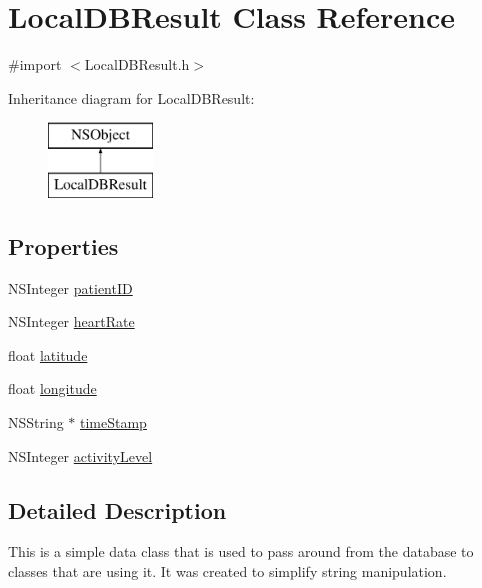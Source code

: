 \hypertarget{interface_local_d_b_result}{\section{Local\-D\-B\-Result Class Reference}
\label{interface_local_d_b_result}
}


{\ttfamily \#import $<$Local\-D\-B\-Result.\-h$>$}

Inheritance diagram for Local\-D\-B\-Result\-:\begin{figure}[H]
\begin{center}
\leavevmode
\includegraphics[height=2.000000cm]{interface_local_d_b_result}
\end{center}
\end{figure}
\subsection*{Properties}
\begin{DoxyCompactItemize}
\item 
N\-S\-Integer \hyperlink{interface_local_d_b_result_a5cdd651e87ce4b0e2ed296fd1a54f271}{patient\-I\-D}
\item 
N\-S\-Integer \hyperlink{interface_local_d_b_result_a59bb8d9536b92e3bbd6c244d13771ccc}{heart\-Rate}
\item 
float \hyperlink{interface_local_d_b_result_a55f83e49659fb4d15db30117f90dcea7}{latitude}
\item 
float \hyperlink{interface_local_d_b_result_ae50e0676b6cac4cad3e565c5caa117b2}{longitude}
\item 
N\-S\-String $\ast$ \hyperlink{interface_local_d_b_result_a7538fcbcfd150e5353d3d4e531bef2bc}{time\-Stamp}
\item 
N\-S\-Integer \hyperlink{interface_local_d_b_result_a10d275e102bd14b0a071b5572fbf62d3}{activity\-Level}
\end{DoxyCompactItemize}


\subsection{Detailed Description}
This is a simple data class that is used to pass around from the database to classes that are using it. It was created to simplify string manipulation. 

